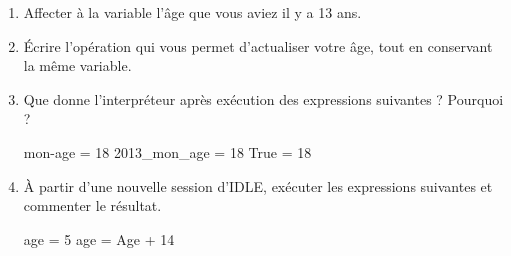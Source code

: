 \begin{enumerate}[label = \emph{\alph*)}]
  \item Affecter à la variable   l'âge que vous aviez il y a 13 ans.
  \item \'Ecrire l'opération qui vous permet d'actualiser votre âge, tout en conservant la même variable.
  \item Que donne l'interpréteur après exécution des expressions suivantes ? Pourquoi ? 
\begin{pyverbatim}
mon-age = 18
2013_mon_age = 18
True = 18
\end{pyverbatim}
  \item \`A partir d'une nouvelle session d'IDLE, exécuter les expressions suivantes et commenter le résultat.
\begin{pyverbatim}
age = 5
age = Age + 14
\end{pyverbatim}
\end{enumerate}